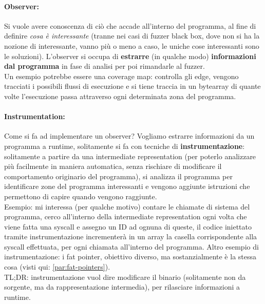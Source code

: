 \paragraph{Observer:} Si vuole avere conoscenza di ciò che accade all'interno del programma, al fine di definire \textit{cosa è interessante} (tranne nei casi di fuzzer black box, dove non si ha la nozione di interessante, vanno più o meno a caso, le uniche cose interessanti sono le soluzioni). L'observer si occupa di \textbf{estrarre} (in qualche modo) \textbf{informazioni dal programma} in fase di analisi per poi rimandarle al fuzzer. \\

Un esempio potrebbe essere una coverage map: controlla gli edge, vengono tracciati i possibili flussi di esecuzione e si tiene traccia in un bytearray di quante volte l'esecuzione passa attraverso ogni determinata zona del programma.\\

\paragraph{Instrumentation:} Come si fa ad implementare un observer? Vogliamo estrarre informazioni da un programma a runtime, solitamente si fa con tecniche di \textbf{instrumentazione}: solitamente a partire da una intermediate representation (per poterlo analizzare più facilmente in maniera automatica, senza rischiare di modificare il comportamento originario del programma), si analizza il programma per identificare zone del programma interessanti e vengono aggiunte istruzioni che permettono di capire quando vengono raggiunte. \\

Esempio: mi interessa (per qualche motivo) contare le chiamate di sistema del programma, cerco all'interno della intermediate representation ogni volta che viene fatta una syscall e assegno un ID ad ognuna di queste, il codice iniettato tramite instrumentazione incrementerà in un array la casella corrispondente alla syscall effettuata, per ogni chiamata all'interno del programma. Altro esempio di instrumentazione: i fat pointer, obiettivo diverso, ma sostanzialmente è la stessa cosa (visti qui: \ref{par:fat-pointers}).\\ 

TL;DR: instrumentazione vuol dire modificare il binario (solitamente non da sorgente, ma da rappresentazione intermedia), per rilasciare informazioni a runtime.\\

